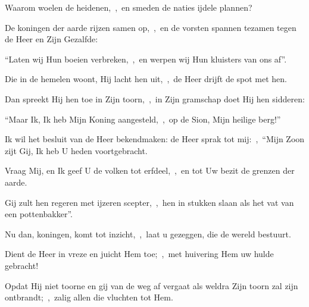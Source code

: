 \documentclass[12pt,twoside,a5paper]{article}
\begin{document}


\begin{halfparskip}
  Waarom woelen de heidenen,~\sep\ en smeden de naties ijdele plannen?


  De koningen der aarde rijzen samen op,~\sep\ en de vorsten spannen tezamen tegen de Heer en Zijn Gezalfde:

  ``Laten wij Hun boeien verbreken,~\sep\ en werpen wij Hun kluisters van ons af''.
\end{halfparskip}


\begin{halfparskip}
  Die in de hemelen woont, Hij lacht hen uit,~\sep\ de Heer drijft de spot met hen.

  Dan spreekt Hij hen toe in Zijn toorn,~\sep\ in Zijn gramschap doet Hij hen sidderen:

  ``Maar Ik, Ik heb Mijn Koning aangesteld,~\sep\ op de Sion, Mijn heilige berg!''
\end{halfparskip}


\begin{halfparskip}
  Ik wil het besluit van de Heer bekendmaken: de Heer sprak tot mij:~\sep\ ``Mijn Zoon zijt Gij, Ik heb U heden voortgebracht.

  Vraag Mij, en Ik geef U de volken tot erfdeel,~\sep\ en tot Uw bezit de grenzen der aarde.

  Gij zult hen regeren met ijzeren scepter,~\sep\ hen in stukken slaan als het vat van een pottenbakker''.
\end{halfparskip}


\begin{halfparskip}
  Nu dan, koningen, komt tot inzicht,~\sep\ laat u gezeggen, die de wereld bestuurt.

  Dient de Heer in vreze en juicht Hem toe;~\sep\ met huivering Hem uw hulde gebracht!

  Opdat Hij niet toorne en gij van de weg af vergaat als weldra Zijn toorn zal zijn ontbrandt;~\sep\ zalig allen die vluchten tot Hem.
\end{halfparskip}
\end{document}
